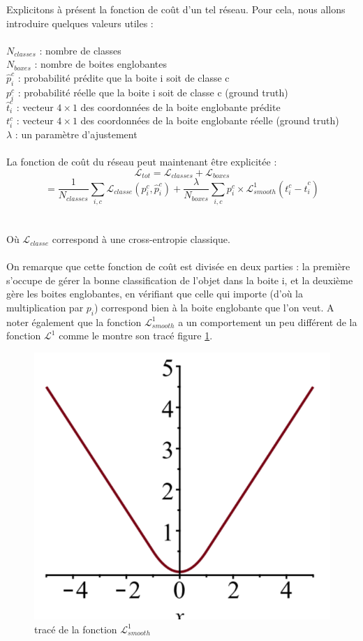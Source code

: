 Explicitons à présent la fonction de coût d'un tel réseau. Pour cela, nous allons introduire quelques valeurs utiles :\\
\\
$N_{classes}$ : nombre de classes \\
$N_{boxes}$ : nombre de boites englobantes \\
$\hat{p}^c_i$ : probabilité prédite que la boite i soit de classe c \\ 
$p^c_i$ : probabilité réelle que la boite i soit de classe c (ground truth) \\ 
$\hat{t}^c_i$ : vecteur $4 \times 1$ des coordonnées de la boite englobante prédite \\ 
$t^c_i$ : vecteur $4 \times 1$ des coordonnées de la boite englobante réelle (ground truth) \\
$\lambda$ : un paramètre d'ajustement\\
\\
La fonction de coût du réseau peut maintenant être explicitée :
$$\mathcal{L}_{tot} = \mathcal{L}_{classes} + \mathcal{L}_{boxes}$$ 
$$= \frac{1}{N_{classes}} \sum_{i,c} \mathcal{L}_{classe}(p^c_i,\hat{p}^c_i) + \frac{ \lambda}{N_{boxes}} \sum_{i,c} p^c_i \times \mathcal{L}^1_{smooth}(t^c_i - \hat{t}^c_i)$$\\
\\
Où $\mathcal{L}_{classe}$ correspond à une cross-entropie classique.\\
\\
On remarque que cette fonction de coût est divisée en deux parties : la première s'occupe de gérer la bonne classification de l'objet dans la boite i, et la deuxième gère les boites englobantes, en vérifiant que celle qui importe (d'où la multiplication par $p_i$) correspond bien à la boite englobante que l'on veut. A noter également que la fonction $\mathcal{L}^1_{smooth}$ a un comportement un peu différent de la fonction $\mathcal{L}^1$ comme le montre son tracé figure \ref{L1_smooth}.

\begin{figure}[!h]
\centering
\includegraphics[width=100pts]{images/Mask_R_CNN/L1_smooth.png} 
\caption{tracé de la fonction $\mathcal{L}^1_{smooth}$}
\label{L1_smooth}
\end{figure}

